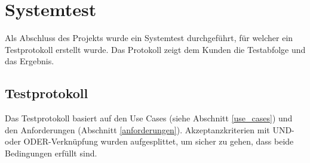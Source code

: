 \section{Systemtest}
Als Abschluss des Projekts wurde ein Systemtest durchgeführt, für welcher ein Testprotokoll erstellt wurde. Das Protokoll zeigt dem Kunden die Testabfolge und das Ergebnis.

\subsection{Testprotokoll}
Das Testprotokoll basiert auf den Use Cases (siehe Abschnitt \ref{use_cases}) und den Anforderungen (Abschnitt \ref{anforderungen}). Akzeptanzkriterien mit UND- oder ODER-Verknüpfung 
wurden aufgesplittet, um sicher zu gehen, dass beide Bedingungen erfüllt sind.

